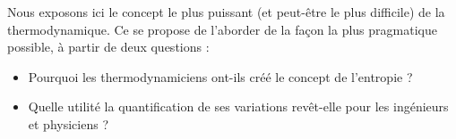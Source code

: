 Nous exposons ici le concept le plus puissant (et peut-être le plus difficile) de la thermodynamique. Ce \courshuit se propose de l’aborder de la façon la plus pragmatique possible, à partir de deux questions :
\begin{itemize}
	\item Pourquoi les thermodynamiciens ont-ils créé le concept de l’entropie ?
	\item Quelle utilité la quantification de ses variations revêt-elle pour les ingénieurs et physiciens ?
\end{itemize}